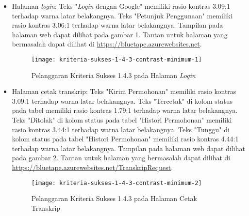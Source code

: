 \begin{itemize}
    \item Halaman \textit{login}: Teks "\textit{Login} dengan Google" memiliki rasio kontras 3.09:1 terhadap warna latar belakangnya. Teks "Petunjuk Penggunaan" memiliki rasio kontras 3.06:1 terhadap warna latar belakangnya. Tampilan pada halaman web dapat dilihat pada gambar \ref{fig:1.4.3_contrast_minimum_1}. Tautan untuk halaman yang bermasalah dapat dilihat di \url{https://bluetape.azurewebsites.net}.
    \begin{figure}[H]
        \centering  
        \texttt{[image: kriteria-sukses-1-4-3-contrast-minimum-1]}  
        \caption[Pelanggaran Kriteria Sukses 1.4.3 pada Halaman \textit{Login}]{Pelanggaran Kriteria Sukses 1.4.3 pada Halaman \textit{Login}}
        \label{fig:1.4.3_contrast_minimum_1}  
    \end{figure} 
    
    \item Halaman cetak transkrip: Teks "Kirim Permohonan" memiliki rasio kontras 3.09:1 terhadap warna latar belakangnya. Teks "Tercetak" di kolom status pada tabel memiliki rasio kontras 1.79:1 terhadap warna latar belakangnya. Teks "Ditolak" di kolom status pada tabel "Histori Permohonan" memiliki rasio kontras 3.44:1 terhadap warna latar belakangnya. Teks "Tunggu" di kolom status pada tabel "Histori Permohonan" memiliki rasio kontras 4.44:1 terhadap warna latar belakangnya. Tampilan pada halaman web dapat dilihat pada gambar \ref{fig:1.4.3_contrast_minimum_2}. Tautan untuk halaman yang bermasalah dapat dilihat di \url{https://bluetape.azurewebsites.net/TranskripRequest}.
    \begin{figure}[H]
        \centering  
        \texttt{[image: kriteria-sukses-1-4-3-contrast-minimum-2]}  
        \caption[Pelanggaran Kriteria Sukses 1.4.3 pada Halaman Cetak Transkrip]{Pelanggaran Kriteria Sukses 1.4.3 pada Halaman Cetak Transkrip}
        \label{fig:1.4.3_contrast_minimum_2}  
    \end{figure} 
    

\end{itemize}
